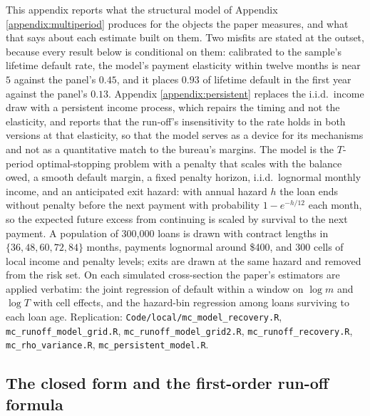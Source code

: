 \documentclass[12pt,english]{article}
\begin{document}
This appendix reports what the structural model of Appendix \ref{appendix:multiperiod} produces for the objects the paper measures, and what that says about each estimate built on them. Two misfits are stated at the outset, because every result below is conditional on them: calibrated to the sample's lifetime default rate, the model's payment elasticity within twelve months is near $5$ against the panel's $0.45$, and it places $0.93$ of lifetime default in the first year against the panel's $0.13$. Appendix \ref{appendix:persistent} replaces the i.i.d.\ income draw with a persistent income process, which repairs the timing and not the elasticity, and reports that the run-off's insensitivity to the rate holds in both versions at that elasticity, so that the model serves as a device for its mechanisms and not as a quantitative match to the bureau's margins. The model is the $T$-period optimal-stopping problem with a penalty that scales with the balance owed, a smooth default margin, a fixed penalty horizon, i.i.d.\ lognormal monthly income, and an anticipated exit hazard: with annual hazard $h$ the loan ends without penalty before the next payment with probability $1 - e^{-h/12}$ each month, so the expected future excess from continuing is scaled by survival to the next payment. A population of 300,000 loans is drawn with contract lengths in $\{36, 48, 60, 72, 84\}$ months, payments lognormal around \$400, and 300 cells of local income and penalty levels; exits are drawn at the same hazard and removed from the risk set. On each simulated cross-section the paper's estimators are applied verbatim: the joint regression of default within a window on $\log m$ and $\log T$ with cell effects, and the hazard-bin regression among loans surviving to each loan age. Replication: \texttt{Code/local/mc\_model\_recovery.R}, \texttt{mc\_runoff\_model\_grid.R}, \texttt{mc\_runoff\_model\_grid2.R}, \texttt{mc\_runoff\_recovery.R}, \texttt{mc\_rho\_variance.R}, \texttt{mc\_persistent\_model.R}.

\subsection{The closed form and the first-order run-off formula}
\end{document}
